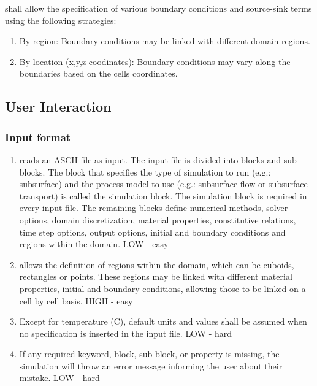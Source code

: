 \pft shall allow the specification of various boundary conditions and source-sink terms using the following strategies:
\begin{enumerate}
	\item By region: \label{repBCRegions} Boundary conditions may be linked with different domain regions.
	\item  By location (x,y,z coodinates): \label{repBCLocation} Boundary conditions may vary along the boundaries based on the cells coordinates.
\end{enumerate}

\subsection{User Interaction}
\subsubsection{Input format}
\begin{enumerate}
	\item \pft reads an ASCII file as input. The input file is divided into blocks and sub-blocks. The block that specifies the type of simulation to run (e.g.: subsurface) and the process model to use (e.g.: subsurface flow or subsurface transport) is called the simulation block. The simulation block is required in every input file. The remaining blocks define numerical methods, solver options, domain discretization, material properties, constitutive relations, time step options, output options, initial and boundary conditions and regions within the domain. \label{inputFile} LOW - easy
	\item \pft allows the definition of regions within the domain, which can be cuboids, rectangles or points. These regions may be linked with different material properties, initial and boundary conditions, allowing those to be linked on a cell by cell basis. \label{inputRegions} HIGH - easy
	\item Except for temperature (C), default units and values shall be assumed when no specification is inserted in the input file. \label{inputUnitsValues} LOW - hard
	\item If any required keyword, block, sub-block, or property is missing, the simulation will throw an error message informing the user about their mistake. \label{inputErrors} LOW - hard
\end{enumerate}

